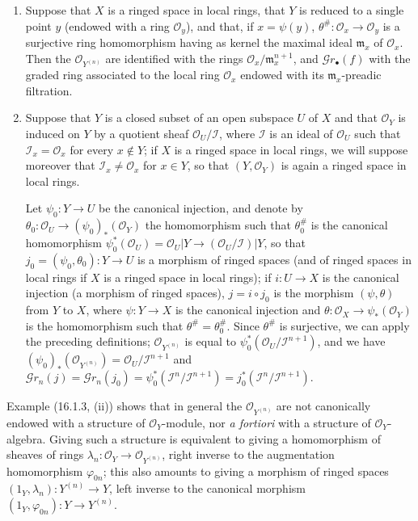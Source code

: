 \begin{examples}[16.1.3]
\label{IV.16.1.3}
\begin{enumerate}
\item[(i)] Suppose that $X$ is a ringed space in local rings, that $Y$ is
reduced to a single point $y$ (endowed with a ring $\mathcal{O}_y$), and that, if
$x=\psi(y)$, $\theta^\#:\mathcal{O}_x\to\mathcal{O}_y$ is a surjective
ring homomorphism having as kernel the maximal ideal $\mathfrak{m}_x$ of
$\mathcal{O}_x$. Then the $\mathcal{O}_{Y^{(n)}}$ are identified with the rings
$\mathcal{O}_x/\mathfrak{m}_x^{n+1}$, and $\mathscr{G}r_\bullet(f)$ with the graded
ring associated to the local ring $\mathcal{O}_x$ endowed with its
$\mathfrak{m}_x$-preadic filtration.
\item[(ii)] Suppose that $Y$ is a closed subset of an open subspace $U$
of $X$ and that $\mathcal{O}_Y$ is induced on $Y$ by a quotient sheaf
$\mathcal{O}_U/\mathscr{I}$, where $\mathscr{I}$ is an ideal of $\mathcal{O}_U$
such that $\mathscr{I}_x=\mathcal{O}_x$ for every $x\notin Y$; if $X$ is a
ringed space in local rings, we will suppose moreover that
$\mathscr{I}_x\neq\mathcal{O}_x$ for $x\in Y$, so that
$(Y,\mathcal{O}_Y)$ is again a ringed space in local rings.

Let $\psi_0:Y\to U$ be the canonical injection, and denote by
$\theta_0:\mathcal{O}_U\to(\psi_0)_*(\mathcal{O}_Y)$ the homomorphism such that
$\theta_0^\#$ is the canonical homomorphism
$\psi_0^*(\mathcal{O}_U)=\mathcal{O}_U|Y\to
(\mathcal{O}_U/\mathscr{I})|Y$, so that
$j_0=(\psi_0,\theta_0):Y\to U$ is a morphism of ringed spaces (and of ringed
spaces in local rings if $X$ is a ringed space in local rings); if
$i:U\to X$ is the canonical injection (a morphism of ringed spaces),
$j=i\circ j_0$ is the morphism $(\psi,\theta)$ from $Y$ to $X$, where
$\psi:Y\to X$ is the canonical injection and
$\theta:\mathcal{O}_X\to\psi_*(\mathcal{O}_Y)$ is the homomorphism such that
$\theta^\#=\theta_0^\#$. Since $\theta^\#$ is surjective, we can apply the
preceding definitions; $\mathcal{O}_{Y^{(n)}}$ is equal to
$\psi_0^*(\mathcal{O}_U/\mathscr{I}^{n+1})$, and we have
$(\psi_0)_*(\mathcal{O}_{Y^{(n)}})=\mathcal{O}_U/\mathscr{I}^{n+1}$ and
$\mathscr{G}r_n(j)=\mathscr{G}r_n(j_0)=
\psi_0^*(\mathscr{I}^n/\mathscr{I}^{n+1})=
j_0^*(\mathscr{I}^n/\mathscr{I}^{n+1})$.
\end{enumerate}
\end{examples}

\begin{env}[16.1.4]
\label{IV.16.1.4}
Example (16.1.3, (ii)) shows that in general the
$\mathcal{O}_{Y^{(n)}}$ are not canonically endowed with a structure of
$\mathcal{O}_Y$-module, nor \emph{a fortiori} with a structure of
$\mathcal{O}_Y$-algebra. Giving such a structure is equivalent to giving a
homomorphism of sheaves of rings
$\lambda_n:\mathcal{O}_Y\to\mathcal{O}_{Y^{(n)}}$, right inverse to
the augmentation homomorphism $\varphi_{0n}$; this also amounts to giving
a morphism of ringed spaces
$(1_Y,\lambda_n):Y^{(n)}\to Y$, left inverse to the canonical morphism
$(1_Y,\varphi_{0n}):Y\to Y^{(n)}$.
\end{env}

